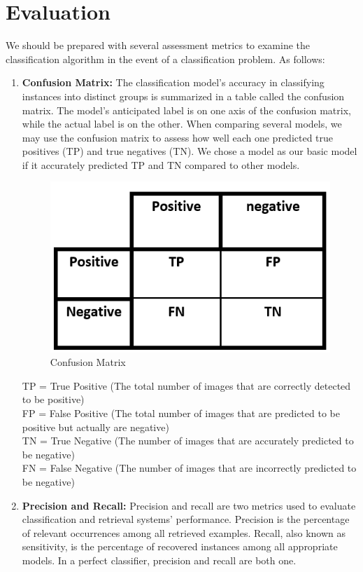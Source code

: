 \section{Evaluation}
We should be prepared with several assessment metrics to examine the classification algorithm in the event of a classification problem. As follows:
\begin{enumerate}
    \item \textbf{Confusion Matrix:} The classification model's accuracy in classifying instances into distinct groups is summarized in a table called the confusion matrix. The model's anticipated label is on one axis of the confusion matrix, while the actual label is on the other. When comparing several models, we may use the confusion matrix to assess how well each one predicted true positives (TP) and true negatives (TN). We chose a model as our basic model if it accurately predicted TP and TN compared to other models.
\begin{figure}[H]
    \centering
    \includegraphics[scale=0.7]{40_Chapter_4/4.png}
    \caption{Confusion Matrix}
    \label{Confusion Matrix}
\end{figure}
TP = True Positive (The total number of images that are
correctly detected to be positive)\\
FP = False Positive (The total number of images that are
predicted to be positive but actually are negative)\\
TN = True Negative (The number of images that are
accurately predicted to be negative)\\
FN = False Negative (The number of images that are
incorrectly predicted to be negative)\\
    \item \textbf{Precision and Recall:} Precision and recall are two metrics used to evaluate classification and retrieval systems' performance. Precision is the percentage of relevant occurrences among all retrieved examples. Recall, also known as sensitivity, is the percentage of recovered instances among all appropriate models. In a perfect classifier, precision and recall are both one. 

\end{enumerate}

